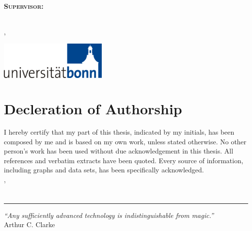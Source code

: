 \begin{titlepage}
	\centering
	
	\Large\scshape
	\infoInstitute\\
	\infoDepartment
	\vspace{0.17\textheight}\\
	
	\Huge\normalfont
	\infoTitleHead
	\vspace{0.3\baselineskip}\\
	\huge\bfseries
	\infoTitle
	\vspace{0.12\textheight}\\
	
	\Large
	\infoThesisType\\[0.3\baselineskip]
	\normalfont\large
	Supervisor:	\infoAdvisor
	\vspace{4\baselineskip}\\
	
	\Large
	\infoAuthorP
	
	\infoAuthorI
	\vspace{4\baselineskip}\\
	\infoLocation, \infoDate
	\vfill
	
	\includegraphics[width=0.4\textwidth]{images/uni_bonn_logo}
	
\end{titlepage}
\restoregeometry


\chapter*{Decleration of Authorship}

I hereby certify that my part of this thesis, indicated by my initials, has been composed by me and is based on my own work, unless stated otherwise.
No other person's work has been used without due acknowledgement in this thesis.
All references and verbatim extracts have been quoted.
Every source of information, including graphs and data sets, has been specifically acknowledged.
\vspace{4\baselineskip}\\
\infoLocation, \infoDate \hfill \infoAuthor
\vspace{4\baselineskip}\\

\chapter*{}
\vfill
\rule{\textwidth}{0.4pt}
\emph{``Any sufficiently advanced technology is indistinguishable from magic.''}\\ Arthur C. Clarke